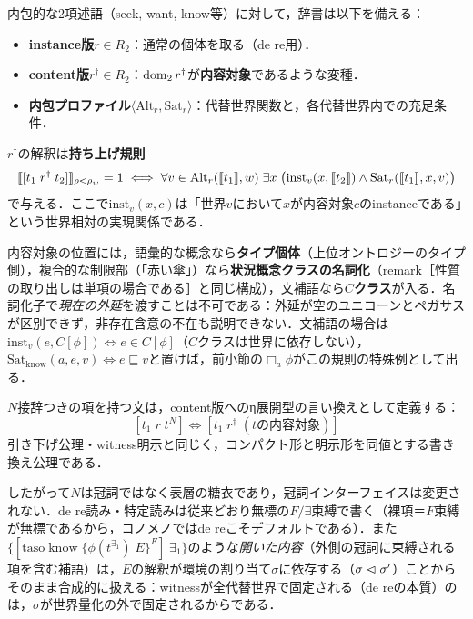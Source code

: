 \documentclass[../../main-detail.tex]{subfiles}
\begin{document}
\begin{definition}[内包動詞の辞書データ]
    内包的な2項述語（seek, want, know等）に対して，辞書は以下を備える：
    \begin{itemize}
        \item \textbf{instance版}$r \in R_2$：通常の個体を取る（de re用）．
        \item \textbf{content版}$r^\dagger \in R_2$：$\mathop{\mathrm{dom}}\nolimits_2 r^\dagger$が\textbf{内容対象}であるような変種．
        \item \textbf{内包プロファイル}$\langle \mathrm{Alt}_r, \mathrm{Sat}_r\rangle$：代替世界関数と，各代替世界内での充足条件．
    \end{itemize}
    $r^\dagger$の解釈は\textbf{持ち上げ規則}
    \[
        \llbracket [t_1\; r^\dagger\; t_2] \rrbracket_{\rho\vartriangleleft\rho_w} = 1 \iff
        \forall v\in \mathrm{Alt}_r(\llbracket t_1\rrbracket, w)\;\exists x\;
        \bigl(\mathrm{inst}_v(x, \llbracket t_2\rrbracket) \land \mathrm{Sat}_r(\llbracket t_1\rrbracket, x, v)\bigr)
    \]
    で与える．ここで$\mathrm{inst}_v(x, c)$は「世界$v$において$x$が内容対象$c$のinstanceである」という世界相対の実現関係である．
\end{definition}
内容対象の位置には，語彙的な概念なら\textbf{タイプ個体}（上位オントロジーのタイプ側），複合的な制限部（「赤い傘」）なら\textbf{状況概念クラスの名詞化}（remark［性質の取り出しは単項の場合である］と同じ構成），文補語なら\textbf{$C$クラス}が入る．名詞化子で\emph{現在の外延}を渡すことは不可である：外延が空のユニコーンとペガサスが区別できず，非存在含意の不在も説明できない．文補語の場合は$\mathrm{inst}_v(e, C[\phi]) \iff e \in C[\phi]$（$C$クラスは世界に依存しない），$\mathrm{Sat}_{\mathrm{know}}(a,e,v) \iff e \sqsubseteq v$と置けば，前小節の$\Box_a\phi$がこの規則の特殊例として出る．

\begin{definition}[持ち上げ公理]
    $N$接辞つきの項を持つ文は，content版へのη展開型の言い換えとして定義する：
    \[
        [t_1\; r\; t^{N}] \iff [t_1\; r^\dagger\; (\text{$t$の内容対象})]
    \]
    引き下げ公理・witness明示と同じく，コンパクト形と明示形を同値とする書き換え公理である．
\end{definition}
したがって$N$は冠詞ではなく表層の糖衣であり，冠詞インターフェイスは変更されない．de re読み・特定読みは従来どおり無標の$F/\exists$束縛で書く（裸項＝$F$束縛が無標であるから，コノメノではde reこそデフォルトである）．また$\{[\text{taso}\; \mathrm{know}\; \{\phi(t^{\exists_1})\; E\}^F]\; \exists_1\}$のような\emph{開いた内容}（外側の冠詞に束縛される項を含む補語）は，$E$の解釈が環境の割り当て$\sigma$に依存する（$\sigma\vartriangleleft\sigma'$）ことからそのまま合成的に扱える：witnessが全代替世界で固定される（de reの本質）のは，$\sigma$が世界量化の外で固定されるからである．
\end{document}
